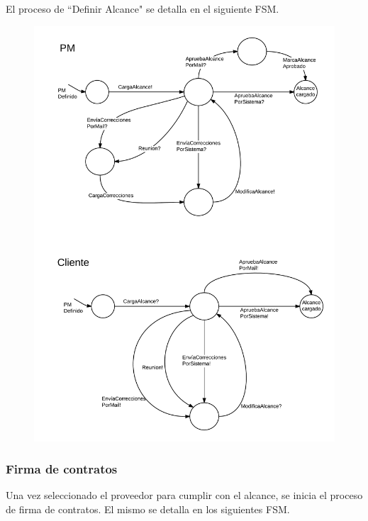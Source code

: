 El proceso de ``Definir Alcance" se detalla en el siguiente FSM. 
\begin{figure}[H]
\includegraphics[width=\linewidth]{diag/nuevos/fsm-alcance.png}
\label{fsm-alcance}
\end{figure}

		\subsubsection{Firma de contratos}
Una vez seleccionado el proveedor para cumplir con el alcance, se inicia 
el proceso de firma de contratos. El mismo se detalla en los siguientes FSM. 

